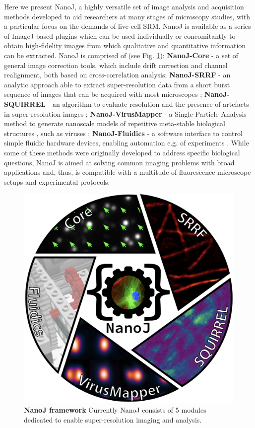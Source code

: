   Here we present NanoJ, a highly versatile set of image analysis and acquisition methods developed to aid researchers at many stages of microscopy studies, with a particular focus on the demands of live-cell SRM. NanoJ is available as a series of ImageJ-based plugins which can be used individually or concomitantly to obtain high-fidelity images from which qualitative and quantitative information can be extracted. NanoJ is comprised of (see Fig. \ref{fig:GeneralDiagram}): \textbf{NanoJ-Core} - a set of general image correction tools, which include drift correction and channel realignment, both based on cross-correlation analysis; \textbf{NanoJ-SRRF} - an analytic approach able to extract super-resolution data from a short burst sequence of images that can be acquired with most microscopes \cite{gustafsson2016fast,culley2018srrf}; \textbf{NanoJ-SQUIRREL} - an algorithm to evaluate resolution and the presence of artefacts in super-resolution images \cite{culley2018quantitative}; \textbf{NanoJ-VirusMapper} - a Single-Particle Analysis method to generate nanoscale models of repetitive meta-stable biological structures \cite{gray2016virus,gray2017}, such as viruses \cite{gray2018nanoscale}; \textbf{NanoJ-Fluidics} - a software interface to control simple fluidic hardware devices, enabling automation e.g. of \multiplexing experiments \cite{almada2018automating}. While some of these methods were originally developed to address specific biological questions, NanoJ is aimed at solving common imaging problems with broad applications and, thus, is compatible with a multitude of fluorescence microscope setups and experimental protocols. 
 
  
\begin{figure}[!t]
    \centering
    \includegraphics[width=\linewidth]{Figures/Figure1_v3.png}
    \caption{\textbf{NanoJ framework} Currently NanoJ consists of 5 modules dedicated to enable super-resolution imaging and analysis.}
    \label{fig:GeneralDiagram}
\end{figure}
  
